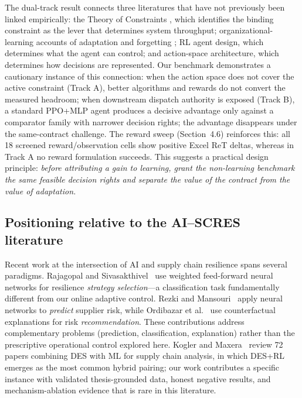 The dual-track result connects three literatures that have not previously
been linked empirically: the Theory of Constraints \cite{goldratt1984goal},
which identifies the binding constraint as the lever that determines system
throughput; organizational-learning accounts of adaptation and forgetting
\cite{levitt1988organizational}; RL agent design, which determines what the
agent can control; and action-space architecture, which determines how
decisions are represented.
Our benchmark demonstrates a cautionary instance of this connection: when the
action space does not cover the active constraint (Track A), better
algorithms and rewards do not convert the measured headroom; when downstream
dispatch authority is exposed (Track B), a standard PPO+MLP agent produces a
decisive advantage only against a comparator family with narrower decision
rights; the advantage disappears under the same-contract challenge. The reward
sweep (Section~4.6) reinforces this: all 18 screened reward/observation cells
show positive Excel ReT deltas, whereas in Track A no reward formulation
succeeds. This suggests a practical design principle: \emph{before attributing
a gain to learning, grant the non-learning benchmark the same feasible
decision rights and separate the value of the contract from the value of
adaptation.}

\hypertarget{54-positioning}{%
\subsection{Positioning relative to the AI--SCRES literature}\label{54-positioning}}

Recent work at the intersection of AI and supply chain resilience spans
several paradigms. Rajagopal and Sivasakthivel~\cite{rajagopal2024} use weighted
feed-forward neural networks for resilience \emph{strategy selection}---a
classification task fundamentally different from our online adaptive control.
Rezki and Mansouri~\cite{rezki2024} apply neural networks to \emph{predict} supplier
risk, while Ordibazar et al.~\cite{ordibazar2022} use counterfactual explanations for
risk \emph{recommendation}. These contributions address complementary
problems (prediction, classification, explanation) rather than the
prescriptive operational control explored here. Kogler and Maxera~\cite{kogler2026}
review 72 papers combining DES with ML for supply chain analysis, in
which DES+RL emerges as the most common hybrid pairing; our work contributes
a specific instance with validated thesis-grounded data, honest negative
results, and mechanism-ablation evidence that is rare in this literature.

